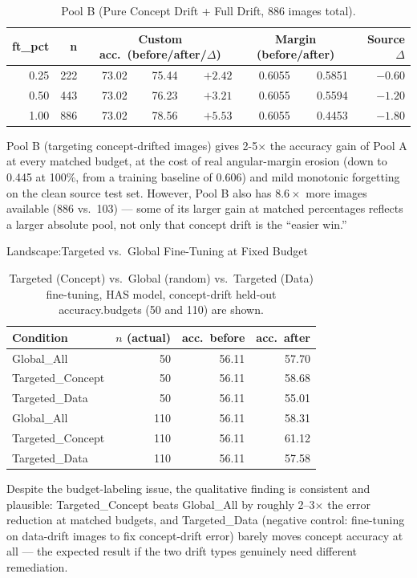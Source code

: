 \begin{table}[htbp]
\centering
\caption{Pool B (Pure Concept Drift + Full Drift, 886 images total).}
\label{tab:extra_pool_b}
\begin{tabular}{@{} r r rrr rr r @{}}
\toprule
\textbf{ft\_pct} & \textbf{n} & \multicolumn{3}{c}{\textbf{Custom acc.\ (before/after/$\Delta$)}} & \multicolumn{2}{c}{\textbf{Margin (before/after)}} & \textbf{Source $\Delta$} \\
\midrule
0.25 & 222 & 73.02 & 75.44 & $+2.42$ & 0.6055 & 0.5851 & $-0.60$ \\
0.50 & 443 & 73.02 & 76.23 & $+3.21$ & 0.6055 & 0.5594 & $-1.20$ \\
1.00 & 886 & 73.02 & 78.56 & $+5.53$ & 0.6055 & 0.4453 & $-1.80$ \\
\bottomrule
\end{tabular}
\end{table}

Pool B (targeting concept-drifted images) gives 2-5$\times$ the accuracy gain of Pool A at every
matched budget, at the cost of real angular-margin erosion (down to 0.445 at 100\%, from a
training baseline of 0.606) and mild monotonic forgetting on the clean source test set. However,
Pool B also has $8.6\times$ more images available (886 vs.\ 103) — some of its larger gain at
matched percentages reflects a larger absolute pool, not only that concept drift is the
``easier win.''


Landscape:Targeted vs.\ Global Fine-Tuning at Fixed Budget
\label{sec:extra_rq1}

\begin{table}[htbp]
\centering
\caption{Targeted (Concept) vs.\ Global (random) vs.\ Targeted (Data) fine-tuning, HAS model, concept-drift held-out accuracy.budgets (50 and 110) are shown.}
\label{tab:extra_rq1}
\begin{tabular}{@{} l r r r @{}}
\toprule
\textbf{Condition} & \textbf{$n$ (actual)} & \textbf{acc.\ before} & \textbf{acc.\ after} \\
\midrule
Global\_All       & 50 & 56.11 & 57.70 \\
Targeted\_Concept & 50 & 56.11 & 58.68 \\
Targeted\_Data    & 50 & 56.11 & 55.01 \\
\midrule
Global\_All       & 110 & 56.11 & 58.31 \\
Targeted\_Concept & 110 & 56.11 & 61.12 \\
Targeted\_Data    & 110 & 56.11 & 57.58 \\
\bottomrule
\end{tabular}
\end{table}

Despite the budget-labeling issue, the qualitative finding is consistent and plausible:
Targeted\_Concept beats Global\_All by roughly 2--3$\times$ the error reduction at matched
budgets, and Targeted\_Data (negative control: fine-tuning on data-drift images to fix
concept-drift error) barely moves concept accuracy at all — the expected result if the two
drift types genuinely need different remediation.
